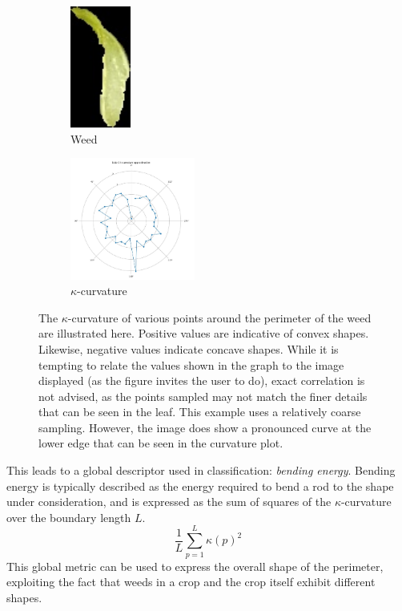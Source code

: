 \documentclass[letterpaper]{report}
\begin{document}
{  \begin{figure}[h!]
	\centering
	\begin{subfigure}[h]{.4\textwidth}
	  \centering
	  \includegraphics[height=4cm]{./figures/for-curvature-blob-1.jpg}
	  \caption{Weed}
	  \label{fig:curvature-weed}
	\end{subfigure}
	\begin{subfigure}[h]{.4\textwidth}
	  \centering
	  \includegraphics[height=4cm]{./figures/curvature-blob-1.jpg}
	  \caption{$\kappa$-curvature}
	  \label{fig:curvature-plot}
	\end{subfigure}
	\caption[Example of $\kappa$-curvature]{The $\kappa$-curvature of various points around the perimeter of the weed are illustrated here. Positive values are indicative of convex shapes. Likewise, negative values indicate concave shapes.  While it is tempting to relate the values shown in the graph to the image displayed (as the figure invites the user to do), exact correlation is not advised, as the points sampled may not match the finer details that can be seen in the leaf. This example uses a relatively coarse sampling. However, the image does show a pronounced curve at the lower edge that can be seen in the curvature plot.}
	\label{fig:curvature}
\end{figure}
This leads to a global descriptor used in classification: \textit{bending energy}. Bending energy is typically described as the energy required to bend a rod to the shape under consideration, and is expressed as the sum of squares of the $\kappa$-curvature over the boundary length $L$.
\begin{equation}
\frac{1}{L} \sum_{p=1}^{L}\kappa(p)^2
\end{equation}
This global metric can be used to express the overall shape of the perimeter, exploiting the fact that weeds in a crop and the crop itself exhibit different shapes.

}
\end{document}
